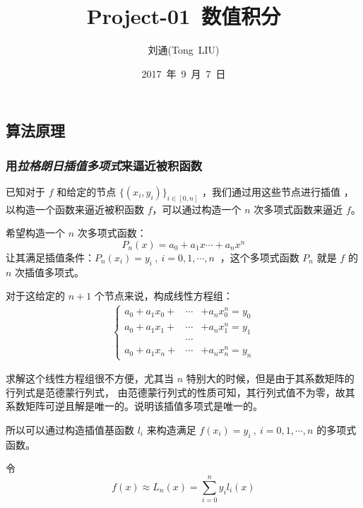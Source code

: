 \documentclass[UTF8, 12pt, a4paper]{ctexart}
\begin{document}
\begin{spacing}{1.5}%

\title{  Project-01~数值积分 } %
\author{刘通(Tong~LIU)} %
\date{2017~年~9~月~7~日} %
\maketitle %
\tableofcontents %
\newpage
\part{算法原理}
\section{用\emph{拉格朗日插值多项式}来逼近被积函数}
已知对于 $ f $ 和给定的节点 $ \{ (x_i,y_i) \}_{i \in [0,n] } $ ，我们通过用这些节点进行插值
，以构造一个函数来逼近被积函数 $ f $，可以通过构造一个 $ n $ 次多项式函数来逼近 $ f $。

希望构造一个 $ n $ 次多项式函数：
$$ P_{n}(x) = a_0 + a_1 x \cdots + a_n x^n  $$
让其满足插值条件：$ P_{n}(x_i) = y_i~,~i=0,1,\cdots,n~$ ，这个多项式函数 $ P_{n} $ 就是
$ f $ 的 $ n $ 次插值多项式。

对于这给定的 $ n+1 $ 个节点来说，构成线性方程组：
\begin{align*}
  \left\{
  \begin{array}{rcl}
a_0 + a_1 x_0 + & \cdots & + a_n x_0^n = y_0 \\
a_0 + a_1 x_1 + & \cdots & + a_n x_1^n = y_1 \\
                & \cdots & \\
a_0 + a_1 x_n + & \cdots & + a_n x_n^n = y_n
  \end{array} \right.
\end{align*}

求解这个线性方程组很不方便，尤其当 $n$ 特别大的时候，但是由于其系数矩阵的行列式是范德蒙行列式，
由范德蒙行列式的性质可知，其行列式值不为零，故其系数矩阵可逆且解是唯一的。说明该插值多项式是唯一的。

所以可以通过构造插值基函数 $ l_i $ 来构造满足 $ f(x_i) = y_i~,~i=0,1,\cdots,n $ 的多项式函数。

令
\begin{equation}
\boxed{ f(x) \approx L_{n}(x) = \sum \limits _{i=0}^{n} y_i l_i(x) }
\label{eq:1}
\end{equation}


\end{spacing}
\end{document}
